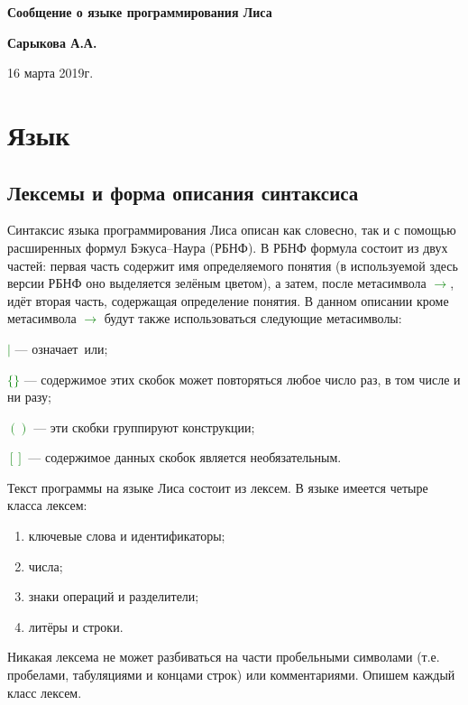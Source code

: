 \documentclass[10pt]{report}
\begin{document}
\begin{titlepage}
\begin{center}
\vspace*{8cm}

{\bf\Huge
Сообщение о языке программирования Лиса

} \vspace{2.5cm}


\LARGE
\textbf{Сарыкова А.А.}

 \vspace{2.5cm}

{16 марта 2019г.}

\end{center}
\end{titlepage}
\tableofcontents

\newpage

\chapter{Язык}
    \section{Лексемы и форма описания синтаксиса}

Синтаксис языка программирования Лиса описан как словесно, так и с помощью расширенных формул Бэкуса--Наура (РБНФ). В РБНФ формула состоит из двух частей: первая часть содержит имя определяемого понятия (в используемой здесь версии РБНФ оно выделяется зелёным цветом), а затем, после метасимвола \textcolor{Green}{$\to$}, идёт вторая часть, содержащая определение понятия. В данном описании кроме метасимвола \textcolor{Green}{$\to$} будут также использоваться следующие метасимволы:

\textcolor{Green}{$|$} --- означает\ \glqq или\grqq;

\textcolor{Green}{$\{\}$} --- содержимое этих скобок может повторяться любое число раз, в том числе и ни разу;

\textcolor{Green}{$( )$} --- эти скобки группируют конструкции;

\textcolor{Green}{$[ ]$} --- содержимое данных скобок является необязательным.

Текст программы на языке Лиса состоит из лексем. В языке имеется четыре класса лексем:
\begin{enumerate}
    \item ключевые слова и идентификаторы;
    \item числа;
    \item знаки операций и разделители;
    \item литёры и строки.
\end{enumerate}
Никакая лексема не может разбиваться на части пробельными символами (т.е. пробелами, табуляциями и концами строк) или комментариями. Опишем каждый класс лексем.
\end{document}
